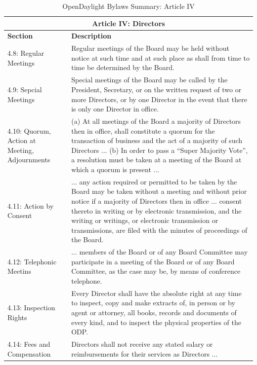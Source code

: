 \documentclass[a4paper, 12pt]{book}
\begin{document}
{\begin{table}[H]
  \begin{center}
    \begin{tabular}{ | p{4cm} | p{11cm} | }
    \toprule
    \multicolumn {2}{|c|}{\textbf{Article IV: Directors}} \\
    \hline
    \textbf{Section} & \textbf{Description} \\
    \hline
    4.8: Regular Meetings & Regular meetings of the Board may be held without notice at such time and at such place as shall from time to time be determined by the Board. \\
    \hline
    4.9: Sepcial Meetings & Special meetings of the Board may be called by the President, Secretary, or on the written request of two or more Directors, or by one Director in the event that there is only one Director in office. \\
    \hline
    4.10: Quorum, Action at Meeting, Adjournments & (a) At all meetings of the Board a majority of Directors then in office, shall constitute a quorum for the transaction of business and the act of a majority of such Directors ... (b) In order to pass a “Super Majority Vote”, a resolution must be taken at a meeting of the Board at which a quorum is present ... \\
    \hline
    4.11: Action by Consent & ... any action required or permitted to be taken by the Board may be taken without a meeting and without prior notice if a majority of Directors then in office ... consent thereto in writing or by electronic transmission, and the writing or writings, or electronic transmission or transmissions, are filed with the minutes of proceedings of the Board. \\
    \hline
    4.12: Telephonic Meetins & ... members of the Board or of any Board Committee may participate in a meeting of the Board or of any Board Committee, as the case may be, by means of conference telephone. \\
    \hline
    4.13: Inspection Rights & Every Director shall have the absolute right at any time to inspect, copy and make extracts of, in person or by agent or attorney, all books, records and documents of every kind, and to inspect the physical properties of the ODP. \\
    \hline
    4.14: Fees and Compensation & Directors shall not receive any stated salary or reimbursements for their services as Directors ... \\
    \bottomrule
    \end{tabular}
    \caption{OpenDaylight Bylaws Summary: Article IV}
    \label{tab:odlbylaws-art04}
  \end{center}
\end{table}

}
\end{document}
